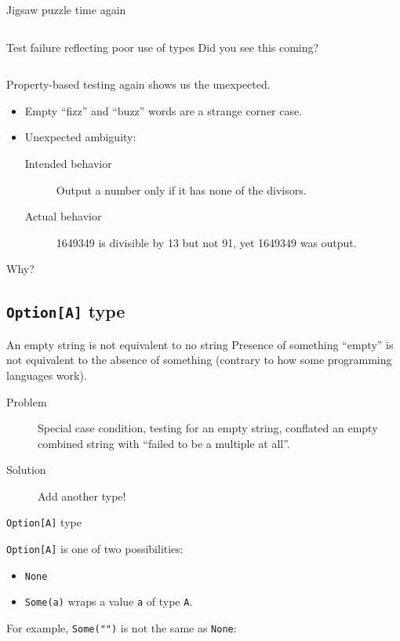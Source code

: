\begin{frame}[fragile]{Jigsaw puzzle time again}
  \inputminted[gobble=2]{scala}{FizzBuzz5.scala}
\end{frame}

\begin{frame}[fragile]{Test failure reflecting poor use of types}
  Did you see this coming?

  \inputminted[gobble=2]{console}{testQuick9.console}

  Property-based testing again shows us the \alert{unexpected}.

  \begin{itemize}
  \item Empty ``fizz'' and ``buzz'' words are a strange corner case.
  \item Unexpected ambiguity:
    \begin{description}
    \item[Intended behavior] Output a number only if it has none of the divisors.
    \item[Actual behavior] 1649349 is divisible by 13 but not 91, yet 1649349 was output.
    \end{description}
  \end{itemize}

  Why?
\end{frame}

\subsection{\texttt{Option[A]} type}

\begin{frame}{An empty string is \alert{not} equivalent to no string}
  Presence of something ``empty'' is \alert{not} equivalent to the absence of something (contrary to how some programming languages work).

  \begin{description}
  \item[Problem] Special case condition, testing for an empty string, conflated an empty combined string with ``failed to be a multiple at all''.
  \item[Solution] Add another type!
  \end{description}
\end{frame}

\begin{frame}[fragile]{\texttt{Option[A]} type}

  \texttt{Option[A]} is one of two possibilities:
  \begin{itemize}
  \item \texttt{None}
  \item \texttt{Some(a)} wraps a value \texttt{a} of type \texttt{A}.
  \end{itemize}

  For example, \texttt{Some("")} is not the same as \texttt{None}:
  \inputminted{scala}{OptionExample1.scala}
\end{frame}

